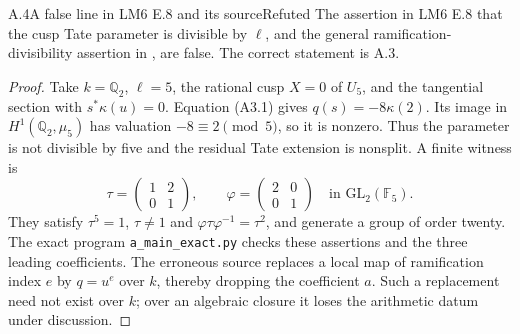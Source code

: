 \begin{statement}{A.4}{A false line in LM6 E.8 and its source}{Refuted}
The assertion in LM6 E.8 that the cusp Tate parameter is divisible by
$\ell$, and the general ramification-divisibility assertion in
\citet[Proposition labelled \texttt{prop:ramificationindexforcuspidal}]{AMSteklov2026},
are false. The correct statement is A.3.
\end{statement}
\begin{proof}
Take $k=\mathbb Q_2$, $\ell=5$, the rational cusp $X=0$ of $U_5$, and the
tangential section with $s^*\kappa(u)=0$. Equation (A3.1) gives
$q(s)=-8\kappa(2)$. Its image in $H^1(\mathbb Q_2,\mu_5)$ has valuation
$-8\equiv2\pmod5$, so it is nonzero. Thus the parameter is not divisible
by five and the residual Tate extension is nonsplit. A finite witness is
\[
 \tau=\begin{pmatrix}1&2\\0&1\end{pmatrix},\qquad
 \varphi=\begin{pmatrix}2&0\\0&1\end{pmatrix}
 \quad\text{in }\mathrm{GL}_2(\mathbb F_5).
\]
They satisfy $\tau^5=1$, $\tau\ne1$ and
$\varphi\tau\varphi^{-1}=\tau^2$, and generate a group of order twenty.
The exact program \texttt{a\_main\_exact.py} checks these assertions and
the three leading coefficients. The erroneous source replaces a local
map of ramification index $e$ by $q=u^e$ over $k$, thereby dropping the
coefficient $a$. Such a replacement need not exist over $k$; over an
algebraic closure it loses the arithmetic datum under discussion.
\end{proof}

